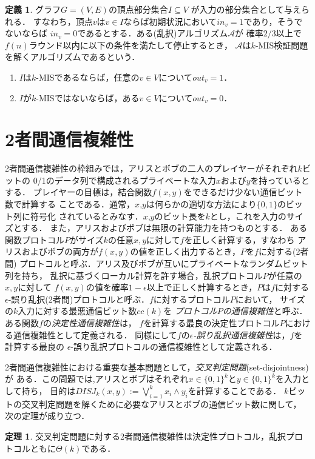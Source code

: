 \documentclass[12pt]{thesis}
\newcommand{\Inp}{\mathit{in}}
\newcommand{\Out}{\mathit{out}}
\theoremstyle{definition}
\newtheorem{theorem}{定理}[chapter]
\newtheorem{definition}{定義}[chapter]
\begin{document}
\begin{definition}
グラフ$G=(V,E)$の頂点部分集合$I \subseteq V$ が入力の部分集合として与えられる．
すなわち，頂点$v$は$v\in I$ならば初期状況において$\Inp_v = 1$であり，そうでないならば
$\Inp_v = 0$であるとする．ある(乱択)アルゴリズム$\mathcal{A}$が
確率$2/3$以上で$f(n)$ラウンド以内に以下の条件を満たして停止するとき，
$\mathcal{A}$は$k$-MIS検証問題を解くアルゴリズムであるという．
\begin{enumerate}
\item $I$は$k$-MISであるならば，任意の$v \in V$について$\Out_v = 1$．
\item $I$が$k$-MISではないならば，ある$v \in V$について$\Out_v = 0$．
\end{enumerate}
\end{definition}

\section{2者間通信複雑性}
2者間通信複雑性の枠組みでは，アリスとボブの二人のプレイヤーがそれぞれ$k$ビットの
0/1のデータ列で構成されるプライベートな入力$x$および$y$を持っているとする．
プレイヤーの目標は，結合関数$f(x,y)$をできるだけ少ない通信ビット数で計算する
ことである．通常，$x$,$y$は何らかの適切な方法により$\{0,1\}$のビット列に符号化
されているとみなす．$x$,$y$のビット長を$k$とし，これを入力のサイズとする．
また，アリスおよびボブは無限の計算能力を持つものとする．
ある関数プロトコル$P$がサイズ$k$の任意$x, y$に対して$f$を正しく計算する，すなわち
アリスおよびボブの両方が$f(x,y)$の値を正しく出力するとき，$P$を$f$に対する(2者間)
プロトコルと呼ぶ．アリス及びボブが互いにプライベートなランダムビット列を持ち，
乱択に基づくローカル計算を許す場合，乱択プロトコル$P$が任意の$x, y$に対して
$f(x,y)$の値を確率$1-\epsilon$以上で正しく計算するとき，$P$は$f$に対する
$\epsilon$-誤り乱択(2者間)プロトコルと呼ぶ．$f$に対するプロトコル$P$において，
サイズの$k$入力に対する最悪通信ビット数$\mathit{cc}(k)$を
\emph{プロトコル$P$の通信複雑性}と呼ぶ．ある関数$f$の\emph{決定性通信複雑性}は，
$f$を計算する最良の決定性プロトコル$P$における通信複雑性として定義される．
同様にして$f$の\emph{$\epsilon$-誤り乱択通信複雑性}は，$f$を計算する最良の
$\epsilon$-誤り乱択プロトコルの通信複雑性として定義される．

2者間通信複雑性における重要な基本問題として，\emph{交叉判定問題}(set-disjointness)が
ある．この問題では,アリスとボブはそれぞれ$x \in \{0, 1\}^{k}$と$y \in \{0, 1\}^{k}$を入力として持ち，
目的は$DISJ_{k} (x, y) :=\bigvee_{i = 1}^{k} x_{i} \land y_{i}$を計算することである．
$k$ビットの交叉判定問題を解くために必要なアリスとボブの通信ビット数に関して，
次の定理が成り立つ\cite{kalyanasundaram1992probabilistic}．
\begin{theorem} \label{thm:disjointness}
交叉判定問題に対する2者間通信複雑性は決定性プロトコル，乱択プロトコルともに$\Theta(k)$である．
\end{theorem}
\end{document}
